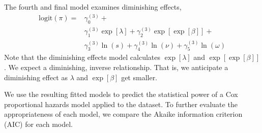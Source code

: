 The fourth and final model examines diminishing effects,
%
\begin{equation}
\begin{aligned}
    \text{logit}(\pi) = & \gamma^{(3)}_{0} + \\ & 
        \gamma^{(3)}_{1} \exp[\lambda] + 
        \gamma^{(3)}_{2} \exp[\exp[\beta]] + \\ & 
        \gamma^{(3)}_{3} \ln(s) + 
        \gamma^{(3)}_{4} \ln(\nu) +
        \gamma^{(3)}_{5} \ln(\omega)
        
\end{aligned}
\end{equation}
%
Note that the diminishing effects model calculates $\exp[\lambda]$ and $\exp[\exp[\beta]]$. We expect a diminishing, inverse relationship. That is, we anticipate a diminishing effect as $\lambda$ and $\exp[\beta]$ get smaller. 

We use the resulting fitted models to predict the statistical power of a Cox proportional hazards model applied to the dataset. To further evaluate the appropriateness of each model, we compare the Akaike information criterion (AIC) \cite{hyndman, sakamoto} for each model. 
